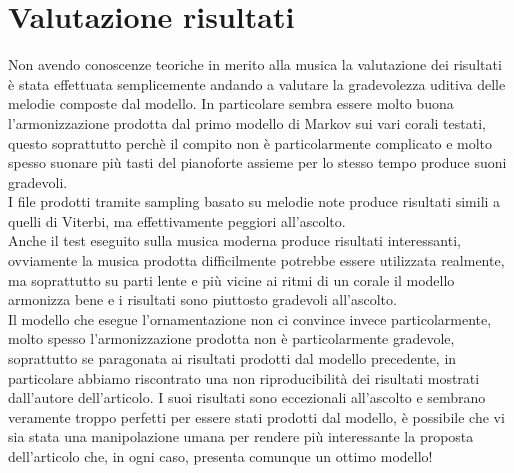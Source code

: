 \chapter{Valutazione risultati}\label{ch:evaluation}
Non avendo conoscenze teoriche in merito alla musica la valutazione dei risultati è stata effettuata semplicemente andando a valutare la gradevolezza uditiva delle melodie composte dal modello.
In particolare sembra essere molto buona l'armonizzazione prodotta dal primo modello di Markov sui vari corali testati, questo soprattutto perchè il compito non è particolarmente complicato e molto spesso suonare più tasti del pianoforte assieme per lo stesso tempo produce suoni gradevoli.\\
I file prodotti tramite sampling basato su melodie note produce risultati simili a quelli di Viterbi, ma effettivamente peggiori all'ascolto.\\
Anche il test eseguito sulla musica moderna produce risultati interessanti, ovviamente la musica prodotta difficilmente potrebbe essere utilizzata realmente, ma soprattutto su parti lente e più vicine ai ritmi di un corale il modello armonizza bene e i risultati sono piuttosto gradevoli all'ascolto.\\
Il modello che esegue l'ornamentazione non ci convince invece particolarmente, molto spesso l'armonizzazione prodotta non è particolarmente gradevole, soprattutto se paragonata ai risultati prodotti dal modello precedente, in particolare abbiamo riscontrato una non riproducibilità dei risultati mostrati dall'autore dell'articolo. I suoi risultati sono eccezionali all'ascolto e sembrano veramente troppo perfetti per essere stati prodotti dal modello, è possibile che vi sia stata una manipolazione umana per rendere più interessante la proposta dell'articolo che, in ogni caso, presenta comunque un ottimo modello!

